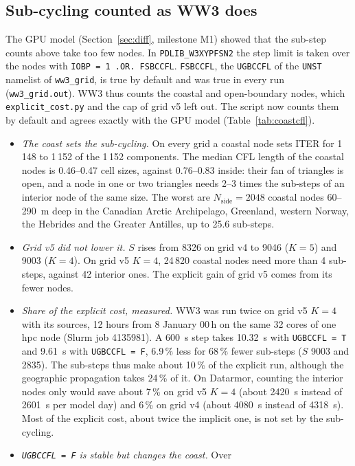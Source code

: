 \documentclass[11pt,a4paper]{article}
\newcommand{\nside}{N_{\mathrm{side}}}
\begin{document}
\subsection{Sub-cycling counted as WW3 does}\label{sec:coastcfl}
The GPU model (Section~\ref{sec:diff}, milestone M1) showed that the
sub-step counts above take too few nodes. In \texttt{PDLIB\_W3XYPFSN2}
the step limit is taken over the nodes with
\texttt{IOBP = 1 .OR. FSBCCFL}. \texttt{FSBCCFL}, the \texttt{UGBCCFL} of
the \texttt{UNST} namelist of \texttt{ww3\_grid}, is true by default and
was true in every run (\texttt{ww3\_grid.out}). WW3 thus counts the coastal
and open-boundary nodes, which \texttt{explicit\_cost.py} and the cap of
grid v5 left out. The script now counts them by default and agrees
exactly with the GPU model (Table~\ref{tab:coastcfl}).
\begin{itemize}
\item \emph{The coast sets the sub-cycling.} On every grid a coastal node
sets ITER for 1\,148 to 1\,152 of the 1\,152 components. The median CFL
length of the coastal nodes is 0.46--0.47 cell sizes, against 0.76--0.83
inside: their fan of triangles is open, and a node in one or two
triangles needs 2--3 times the sub-steps of an interior node of the same
size. The worst are $\nside=2048$ coastal nodes 60--\SI{290}{m} deep in
the Canadian Arctic Archipelago, Greenland, western Norway, the Hebrides
and the Greater Antilles, up to 25.6 sub-steps.
\item \emph{Grid v5 did not lower it.} $S$ rises from 8326 on grid v4 to
9046 ($K=5$) and 9003 ($K=4$). On grid v5 $K=4$, 24\,820 coastal nodes
need more than 4 sub-steps, against 42 interior ones. The explicit gain of
grid v5 comes from its fewer nodes.
\item \emph{Share of the explicit cost, measured.} WW3 was run twice on
grid v5 $K=4$ with its sources, 12 hours from 8 January 00\,h on the same
32 cores of one hpc node (Slurm job 4135981). A \SI{600}{s} step takes
\SI{10.32}{s} with \texttt{UGBCCFL = T} and \SI{9.61}{s} with
\texttt{UGBCCFL = F}, 6.9\,\% less for 68\,\% fewer sub-steps ($S$ 9003
and 2835). The sub-steps thus make about 10\,\% of the explicit run,
although the geographic propagation takes 24\,\% of it. On Datarmor,
counting the interior nodes only would save about 7\,\% on grid v5 $K=4$
(about \SI{2420}{s} instead of \SI{2601}{s} per model day) and 6\,\% on
grid v4 (about \SI{4080}{s} instead of \SI{4318}{s}). Most of the
explicit cost, about twice the implicit one, is not set by the
sub-cycling.
\item \emph{\texttt{UGBCCFL = F} is stable but changes the coast.} Over

\end{itemize}
\end{document}

